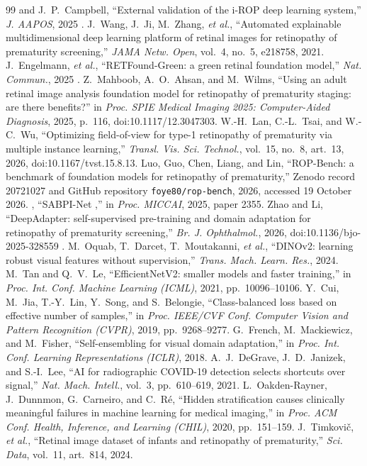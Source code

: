 \begin{thebibliography}{99}
 and J.~P.~Campbell, ``External validation of the i-ROP deep learning system,'' \emph{J. AAPOS}, 2025 .
J.~Wang, J.~Ji, M.~Zhang, \emph{et al.}, ``Automated explainable multidimensional deep learning platform of retinal images for retinopathy of prematurity screening,'' \emph{JAMA Netw. Open}, vol.~4, no.~5, e218758, 2021.
J.~Engelmann, \emph{et al.}, ``RETFound-Green: a green retinal foundation model,'' \emph{Nat. Commun.}, 2025 .
Z.~Mahboob, A.~O.~Ahsan, and M.~Wilms, ``Using an adult retinal image analysis foundation model for retinopathy of prematurity staging: are there benefits?'' in \emph{Proc. SPIE Medical Imaging 2025: Computer-Aided Diagnosis}, 2025, p.~116, doi:10.1117/12.3047303.
W.-H.~Lan, C.-L.~Tsai, and W.-C.~Wu, ``Optimizing field-of-view for type-1 retinopathy of prematurity via multiple instance learning,'' \emph{Transl. Vis. Sci. Technol.}, vol.~15, no.~8, art.~13, 2026, doi:10.1167/tvst.15.8.13.
Luo, Guo, Chen, Liang, and Lin, ``ROP-Bench: a benchmark of foundation models for retinopathy of prematurity,'' Zenodo record 20721027 and GitHub repository \texttt{foye80/rop-bench}, 2026, accessed 19 October 2026.
, ``SABPI-Net ,'' in \emph{Proc. MICCAI}, 2025, paper 2355.
Zhao and Li, ``DeepAdapter: self-supervised pre-training and domain adaptation for retinopathy of prematurity screening,'' \emph{Br. J. Ophthalmol.}, 2026, doi:10.1136/bjo-2025-328559 .
M.~Oquab, T.~Darcet, T.~Moutakanni, \emph{et al.}, ``DINOv2: learning robust visual features without supervision,'' \emph{Trans. Mach. Learn. Res.}, 2024.
M.~Tan and Q.~V.~Le, ``EfficientNetV2: smaller models and faster training,'' in \emph{Proc. Int. Conf. Machine Learning (ICML)}, 2021, pp.~10096--10106.
Y.~Cui, M.~Jia, T.-Y.~Lin, Y.~Song, and S.~Belongie, ``Class-balanced loss based on effective number of samples,'' in \emph{Proc. IEEE/CVF Conf. Computer Vision and Pattern Recognition (CVPR)}, 2019, pp.~9268--9277.
G.~French, M.~Mackiewicz, and M.~Fisher, ``Self-ensembling for visual domain adaptation,'' in \emph{Proc. Int. Conf. Learning Representations (ICLR)}, 2018.
A.~J.~DeGrave, J.~D.~Janizek, and S.-I.~Lee, ``AI for radiographic COVID-19 detection selects shortcuts over signal,'' \emph{Nat. Mach. Intell.}, vol.~3, pp.~610--619, 2021.
L.~Oakden-Rayner, J.~Dunnmon, G.~Carneiro, and C.~R\'e, ``Hidden stratification causes clinically meaningful failures in machine learning for medical imaging,'' in \emph{Proc. ACM Conf. Health, Inference, and Learning (CHIL)}, 2020, pp.~151--159.
J.~Timkovi\v{c}, \emph{et al.}, ``Retinal image dataset of infants and retinopathy of prematurity,'' \emph{Sci. Data}, vol.~11, art.~814, 2024.
\end{thebibliography}
\endgroup
